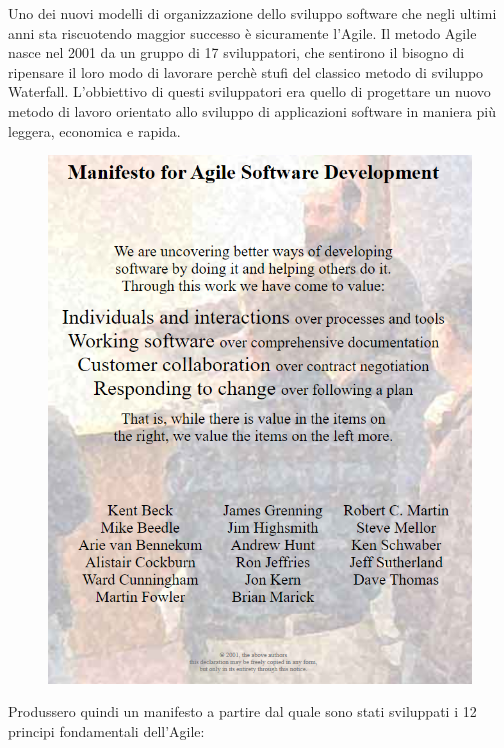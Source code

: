 Uno dei nuovi modelli di organizzazione dello sviluppo software che negli ultimi anni sta riscuotendo maggior successo è sicuramente l’Agile. Il metodo Agile nasce nel 2001 da un gruppo di 17 sviluppatori, che sentirono il bisogno di ripensare il loro modo di lavorare perchè stufi del classico metodo di sviluppo Waterfall. 
L'obbiettivo di questi sviluppatori era quello di progettare un nuovo metodo di lavoro orientato allo sviluppo di applicazioni software in maniera più leggera, economica e rapida. 




\begin{figure}[h!]
	\centering
	\includegraphics[width=\textwidth]{"immagini/agile_manifesto"}
\end{figure}

Produssero quindi un manifesto a partire dal quale sono stati sviluppati i 12 principi fondamentali dell'Agile:

